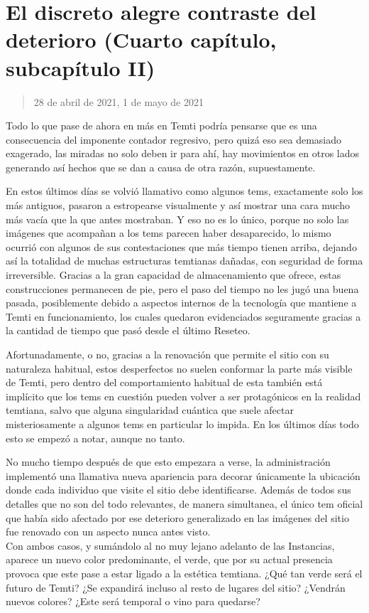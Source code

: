 \documentclass[
  spanish,
]{book}
\begin{document}
\hypertarget{el-discreto-alegre-contraste-del-deterioro-cuarto-capuxedtulo-subcapuxedtulo-ii}{%
\section{El discreto alegre contraste del deterioro (Cuarto capítulo, subcapítulo II)}\label{el-discreto-alegre-contraste-del-deterioro-cuarto-capuxedtulo-subcapuxedtulo-ii}}

\begin{quote}
28 de abril de 2021, 1 de mayo de 2021
\end{quote}

Todo lo que pase de ahora en más en Temti podría pensarse que es una consecuencia del imponente contador regresivo, pero quizá eso sea demasiado exagerado, las miradas no solo deben ir para ahí, hay movimientos en otros lados generando así hechos que se dan a causa de otra razón, supuestamente.

En estos últimos días se volvió llamativo como algunos tems, exactamente solo los más antiguos, pasaron a estropearse visualmente y así mostrar una cara mucho más vacía que la que antes mostraban. Y eso no es lo único, porque no solo las imágenes que acompañan a los tems parecen haber desaparecido, lo mismo ocurrió con algunos de sus contestaciones que más tiempo tienen arriba, dejando así la totalidad de muchas estructuras temtianas dañadas, con seguridad de forma irreversible. Gracias a la gran capacidad de almacenamiento que ofrece, estas construcciones permanecen de pie, pero el paso del tiempo no les jugó una buena pasada, posiblemente debido a aspectos internos de la tecnología que mantiene a Temti en funcionamiento, los cuales quedaron evidenciados seguramente gracias a la cantidad de tiempo que pasó desde el último Reseteo.

Afortunadamente, o no, gracias a la renovación que permite el sitio con su naturaleza habitual, estos desperfectos no suelen conformar la parte más visible de Temti, pero dentro del comportamiento habitual de esta también está implícito que los tems en cuestión pueden volver a ser protagónicos en la realidad temtiana, salvo que alguna singularidad cuántica que suele afectar misteriosamente a algunos tems en particular lo impida. En los últimos días todo esto se empezó a notar, aunque no tanto.

No mucho tiempo después de que esto empezara a verse, la administración implementó una llamativa nueva apariencia para decorar únicamente la ubicación donde cada individuo que visite el sitio debe identificarse. Además de todos sus detalles que no son del todo relevantes, de manera simultanea, el único tem oficial que había sido afectado por ese deterioro generalizado en las imágenes del sitio fue renovado con un aspecto nunca antes visto.\\
Con ambos casos, y sumándolo al no muy lejano adelanto de las Instancias, aparece un nuevo color predominante, el verde, que por su actual presencia provoca que este pase a estar ligado a la estética temtiana. ¿Qué tan verde será el futuro de Temti? ¿Se expandirá incluso al resto de lugares del sitio? ¿Vendrán nuevos colores? ¿Este será temporal o vino para quedarse?
\end{document}
